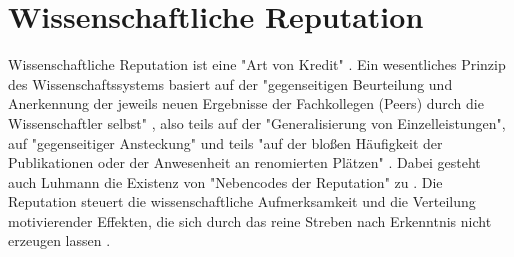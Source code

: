 \section{Wissenschaftliche Reputation}

Wissenschaftliche Reputation ist eine "Art von Kredit" \cite{luhmann_1970_selbststeuerung}. Ein wesentliches Prinzip des Wissenschaftssystems basiert auf der "gegenseitigen Beurteilung und Anerkennung der jeweils neuen Ergebnisse der Fachkollegen (Peers) durch die Wissenschaftler selbst"\cite{Hanekop_2014} \cite{suchen_Hornbostel_2006}, also teils auf der "Generalisierung von Einzelleistungen", auf "gegenseitiger Ansteckung" und teils "auf der bloßen Häufigkeit der Publikationen oder der Anwesenheit an renomierten Plätzen" \cite{luhmann_1970_selbststeuerung}. Dabei gesteht auch Luhmann die Existenz von "Nebencodes der Reputation" zu \cite{schmoch_2003_hochschulforschung}. Die Reputation steuert die wissenschaftliche Aufmerksamkeit und die Verteilung motivierender Effekten, die sich durch das reine Streben nach Erkenntnis nicht erzeugen lassen \cite{suchen_luhmann}.

